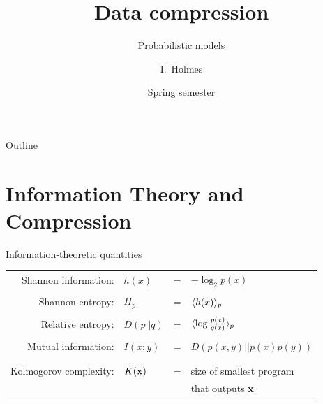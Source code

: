 \documentclass{beamer}
\title[Compression] %
{Data compression}
\subtitle
{Probabilistic models} %
\author%
{I.~Holmes} %
\institute[University of California, Berkeley] %
{
  Department of Bioengineering\\
  University of California, Berkeley}
\date%
{Spring semester}
\begin{document}
\begin{frame}
  \titlepage
\end{frame}

\begin{frame}{Outline}
  \tableofcontents
\end{frame}

\section{Information Theory and Compression}

\begin{frame}{Information-theoretic quantities}

\begin{tabular}{rlcl}
Shannon information: & $h(x)$ & = & $-\log_2 p(x)$ \\
\\
Shannon entropy: & $H_p$ & = & $\langle h(x) \rangle_p$ \\
\\
Relative entropy: & $D(p||q)$ & = & $\langle \log \frac{p(x)}{q(x)} \rangle_p$ \\
\\
Mutual information: & $I(x;y)$ & = & $D\left(p(x,y)||p(x)p(y)\right)$ \\
\\
\\
Kolmogorov complexity: & $K({\bf x})$ & = & size of smallest program \\ & & & that outputs ${\bf x}$
\end{tabular}

\end{frame}
\end{document}
